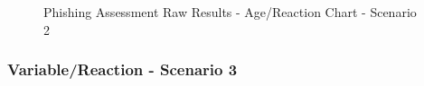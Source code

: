 \documentclass[a4paper]{article}
\begin{document}
\vspace{5mm}

\begin{figure}[H]
	\centering
	\caption{Phishing Assessment Raw Results - Age/Reaction Chart - Scenario 2}
	\label{chart-age-s2}
\end{figure}

\newpage

\subsubsection*{Variable/Reaction - Scenario 3}
\end{document}

